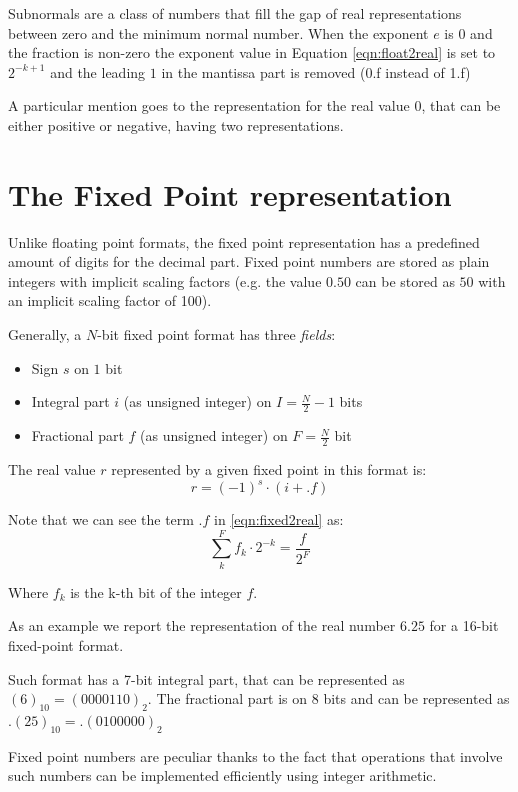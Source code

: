 Subnormals are a class of numbers that fill the gap of real representations between zero and the minimum normal number. When the exponent $e$ is $0$ and the fraction is non-zero the exponent value in Equation \ref{eqn:float2real} is set to $2^{-k+1}$ and the leading $1$ in the mantissa part is removed (0.f instead of 1.f)

A particular mention goes to the representation for the real value $0$, that can be either positive or negative, having two representations.


\section{The Fixed Point representation}

Unlike floating point formats, the fixed point representation has a predefined amount of digits for the decimal part. Fixed point numbers are stored as plain integers with implicit scaling factors (e.g. the value $0.50$ can be stored as $50$ with an implicit scaling factor of 100).

Generally, a $N$-bit fixed point format has three \textit{fields}:

\begin{itemize}
    \item Sign $s$ on $1$ bit
    \item Integral part $i$ (as unsigned integer) on $I = \frac{N}{2} - 1$ bits
    \item Fractional part $f$ (as unsigned integer) on $F = \frac{N}{2}$ bit
\end{itemize}

The real value $r$ represented by a given fixed point in this format is:
\begin{equation}\label{eqn:fixed2real}
    r = (-1)^s \cdot \left( i + .f \right)
\end{equation}

Note that we can see the term $.f$ in \eqref{eqn:fixed2real} as:
\[
    \sum_k^F f_k \cdot 2^{-k} = \frac{f}{2^F}
\]

Where $f_k$ is the k-th bit of the integer $f$.

As an example we report the representation of the real number $6.25$ for a 16-bit fixed-point format.

Such format has a 7-bit integral part, that can be represented as $(6)_{10} = {(0000110)}_{2}$.
The fractional part is on 8 bits and can be represented as $ .(25)_{10} = .(0100000)_{2}$

Fixed point numbers are peculiar thanks to the fact that operations that involve such numbers can be implemented efficiently using integer arithmetic.

